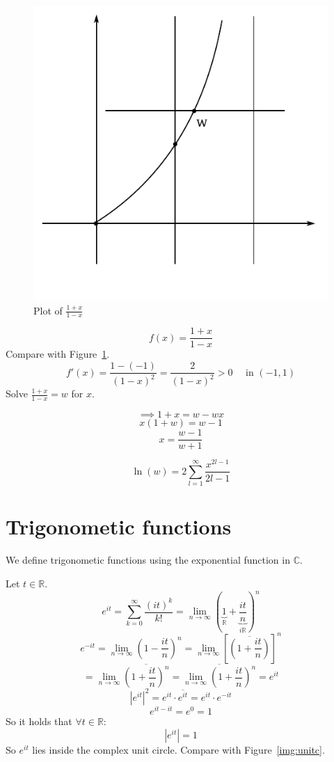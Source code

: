 \documentclass[a4paper,landscape,twocolumn]{article}
\theoremstyle{definition}
\newcommand\abs[1]{\left|#1\right|}
\begin{document}
\begin{figure}[!h]
  \begin{center}
    \includegraphics{img/1x_1-x.pdf}
    \caption{Plot of $\frac{1+x}{1-x}$}
    \label{img:1x-1x}
  \end{center}
\end{figure}

\[ f(x) = \frac{1 + x}{1 - x} \]
Compare with Figure~\ref{img:1x-1x}.
\[ f'(x) = \frac{1 - (-1)}{(1 - x)^2} = \frac{2}{(1 - x)^2} > 0 \quad \text{ in } (-1, 1) \]
Solve $\frac{1 + x}{1 - x} = w$ for $x$.

\[ \implies 1 + x  = w - wx \]
\[ x (1 + w) = w - 1 \]
\[ x = \frac{w - 1}{w + 1} \]

\[ \ln(w) = 2 \sum_{l=1}^\infty \frac{x^{2l-1}}{2l - 1} \]

\section{Trigonometic functions}

We define trigonometic functions using the exponential function in $\mathbb C$.

Let $t \in \mathbb R$.
\[ e^{it} = \sum_{k=0}^\infty \frac{(it)^k}{k!} = \lim_{n\to\infty} \left(\underbrace{1}_{\mathbb R} + \underbrace{\frac{it}{n}}_{i \mathbb R}\right)^n \]
\[
  e^{-it}
    = \lim_{n\to\infty} \left(1 - \frac{it}{n}\right)^n
    = \lim_{n\to\infty} \left[\overline{\left(1 + \frac{it}{n}\right)}\right]^n
\] \[
  = \lim_{n\to\infty} \overline{\left(1 + \frac{it}{n}\right)^n}
  = \overline{\lim_{n\to\infty} \left(1 + \frac{it}{n}\right)^n}
  = e^{it}
\] \[
  \abs{e^{it}}^2 = e^{it} \cdot \overline{e^{it}} = e^{it} \cdot e^{-it}
\] \[
  e^{it - it} = e^0 = 1
\]
So it holds that $\forall t \in \mathbb R$:
\[ \abs{e^{it}} = 1 \]
So $e^{it}$ lies inside the complex unit circle. Compare with Figure~\ref{img:unitc}.
\end{document}

